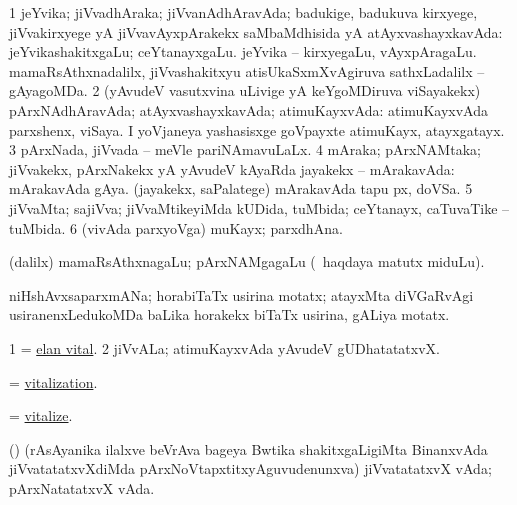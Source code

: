 \bentry 
{} 
\gl{\gu}
\expl{}
\bmng
\bnum
\num{1} jeYvika; jiVvadhAraka; jiVvanAdhAravAda; badukige, badukuva kirxyege, jiVvakirxyege yA jiVvavAyxpArakekx saMbaMdhisida yA atAyxvashayxkavAda:  jeYvikashakitxgaLu; ceYtanayxgaLu.  jeYvika -- kirxyegaLu, vAyxpAragaLu.  mamaRsAthxnadalilx, jiVvashakitxyu atisUkaSxmXvAgiruva sathxLadalilx -- gAyagoMDa. 
\num{2} (yAvudeV vasutxvina uLivige yA keYgoMDiruva viSayakekx) pArxNAdhAravAda; atAyxvashayxkavAda; atimuKayxvAda:  atimuKayxvAda parxshenx, viSaya.  I yoVjaneya yashasisxge goVpayxte atimuKayx, atayxgatayx. 
\num{3} pArxNada, jiVvada -- meVle pariNAmavuLaLx. 
\num{4} mAraka; pArxNAMtaka; jiVvakekx, pArxNakekx yA yAvudeV kAyaRda jayakekx -- mArakavAda:  mArakavAda gAya.  (jayakekx, saPalatege) mArakavAda tapu px, doVSa. 
\num{5} jiVvaMta; sajiVva; jiVvaMtikeyiMda kUDida, tuMbida; ceYtanayx, caTuvaTike -- tuMbida. 
\num{6} (vivAda parxyoVga) muKayx; parxdhAna. 
\enum
\emng
\eentry

\bentry 
{} 
\gl{\nA}
\expl{}
\bmng
 (\bava dalilx) mamaRsAthxnagaLu; pArxNAMgagaLu (\kanmu\ haqdaya matutx miduLu). 
\emng
\eentry

\bentry
{}
\gl{\nA}
\expl{}
\bmng
 niHshAvxsaparxmANa; horabiTaTx usirina motatx; atayxMta diVGaRvAgi usiranenxLedukoMDa baLika horakekx biTaTx usirina, gALiya motatx. 
\emng
\eentry

\bentry 
{}
\gl{\nA}
\expl{}
\bmng
\bnum
\num{1} = \hyperref{kandict_e.pdf}{E}{elan vital}{elan vital}. 
\num{2} jiVvALa; atimuKayxvAda yAvudeV gUDhatatatxvX. 
\enum
\emng
\eentry

\bentry
{} 
\gl{\nA}
\expl{}
\bmng
 = \hyperlink{vitalization}{vitalization}. 
\emng
\eentry

\bentry
{} 
\gl{\sakirx}
\expl{}
\bmng
 = \hyperlink{vitalize}{vitalize}. 
\emng
\eentry

\bentry
{} 
\gl{\nA}
\expl{}
\bmng
 (\jiVvi) (rAsAyanika ilalxve beVrAva bageya Bwtika shakitxgaLigiMta BinanxvAda jiVvatatatxvXdiMda pArxNoVtapxtitxyAguvudenunxva) jiVvatatatxvX vAda; pArxNatatatxvX vAda. 
\emng
\eentry

